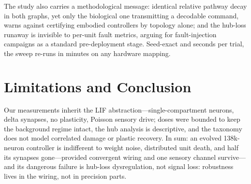 The study also carries a methodological message: identical relative pathway decay in both graphs, yet only the biological one transmitting a decodable command, warns against certifying embodied controllers by topology alone; and the hub-loss runaway is invisible to per-unit fault metrics, arguing for fault-injection campaigns as a standard pre-deployment stage\cite{yik2023neurobench,medvedeva2025formalizing}. Seed-exact and seconds per trial, the sweep re-runs in minutes on any hardware mapping\cite{wang2025neuromorphic}.

\section{Limitations and Conclusion}
Our measurements inherit the LIF abstraction---single-compartment neurons, delta synapses, no plasticity, Poisson sensory drive; doses were bounded to keep the background regime intact, the hub analysis is descriptive, and the taxonomy does not model correlated damage or plastic recovery. In sum: an evolved 138k-neuron controller is indifferent to weight noise, distributed unit death, and half its synapses gone---provided convergent wiring and one sensory channel survive---and its dangerous failure is hub-loss dysregulation, not signal loss: robustness lives in the wiring, not in precision parts.
